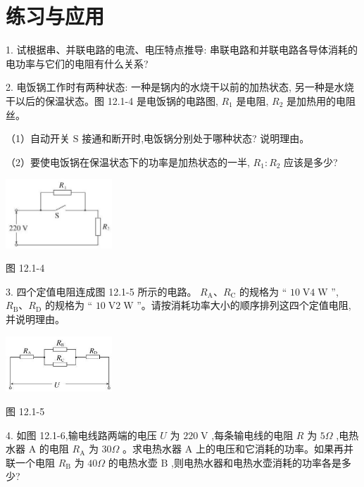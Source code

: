 \documentclass[10pt]{article}
\begin{document}
\section*{练习与应用}

1. 试根据串、并联电路的电流、电压特点推导: 串联电路和并联电路各导体消耗的电功率与它们的电阻有什么关系?

2. 电饭锅工作时有两种状态: 一种是锅内的水烧干以前的加热状态, 另一种是水烧干以后的保温状态。图 12.1-4 是电饭锅的电路图, \({R}_{1}\) 是电阻, \({R}_{2}\) 是加热用的电阻丝。

（1）自动开关 \(\mathrm{S}\) 接通和断开时,电饭锅分别处于哪种状态? 说明理由。

（2）要使电饭锅在保温状态下的功率是加热状态的一半, \({R}_{1} : {R}_{2}\) 应该是多少?

\begin{center}
\includegraphics[max width=0.3\textwidth]{images/01911d5f-8e38-70c0-b5b8-2b399bd115b6_87_516342.jpg}
\end{center}

图 12.1-4

3. 四个定值电阻连成图 12.1-5 所示的电路。 \({R}_{\mathrm{A}}\text{、}{R}_{\mathrm{C}}\) 的规格为 “ \({10}\mathrm{\;V}4\mathrm{\;W}\) ”, \({R}_{\mathrm{B}}\text{、}{R}_{\mathrm{D}}\) 的规格为 “ \({10}\mathrm{\;V}2\mathrm{\;W}\) ”。请按消耗功率大小的顺序排列这四个定值电阻, 并说明理由。

\begin{center}
\includegraphics[max width=0.3\textwidth]{images/01911d5f-8e38-70c0-b5b8-2b399bd115b6_87_286342.jpg}
\end{center}

图 12.1-5

4. 如图 12.1-6,输电线路两端的电压 \(U\) 为 \({220}\mathrm{\;V}\) ,每条输电线的电阻 \(R\) 为 \({5\Omega }\) ,电热水器 \(\mathrm{A}\) 的电阻 \({R}_{\mathrm{A}}\) 为 \({30\Omega }\) 。求电热水器 \(\mathrm{A}\) 上的电压和它消耗的功率。如果再并联一个电阻 \({R}_{\mathrm{B}}\) 为 \({40\Omega }\) 的电热水壶 \(\mathrm{B}\) ,则电热水器和电热水壶消耗的功率各是多少?
\end{document}
